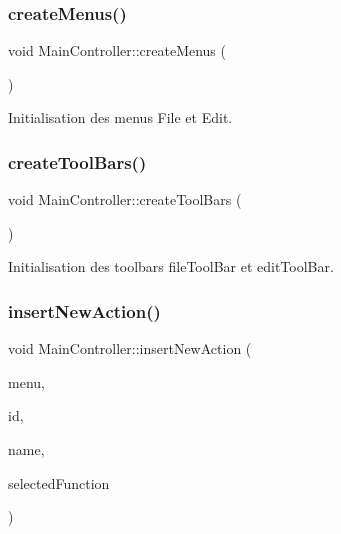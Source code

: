 \subsubsection{\texorpdfstring{create\+Menus()}{createMenus()}}
{\footnotesize\ttfamily void Main\+Controller\+::create\+Menus (\begin{DoxyParamCaption}{ }\end{DoxyParamCaption})\hspace{0.3cm}{\ttfamily [private]}}



Initialisation des menus File et Edit. 

\mbox{\label{class_main_controller_a141a116374c3605e54325bba6eaddb94}} 
\subsubsection{\texorpdfstring{create\+Tool\+Bars()}{createToolBars()}}
{\footnotesize\ttfamily void Main\+Controller\+::create\+Tool\+Bars (\begin{DoxyParamCaption}{ }\end{DoxyParamCaption})\hspace{0.3cm}{\ttfamily [private]}}



Initialisation des toolbars file\+Tool\+Bar et edit\+Tool\+Bar. 

\mbox{\label{class_main_controller_a48891e5a376e8315956222690238938f}} 
\subsubsection{\texorpdfstring{insert\+New\+Action()}{insertNewAction()}}
{\footnotesize\ttfamily void Main\+Controller\+::insert\+New\+Action (\begin{DoxyParamCaption}\item[{Q\+Menu $\ast$}]{menu,  }\item[{int}]{id,  }\item[{const Q\+String \&}]{name,  }\item[{void(Automata\+Manager\+::$\ast$)(unsigned int const)}]{selected\+Function }\end{DoxyParamCaption})\hspace{0.3cm}{\ttfamily [private]}}



